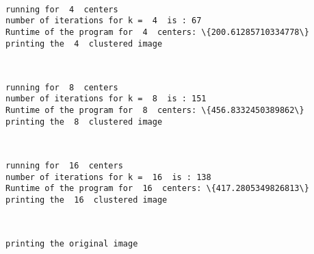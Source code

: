 \documentclass[11pt]{article}
\begin{document}
    \begin{center}
    \end{center}
    { \hspace*{\fill} \\}
    
    \begin{Verbatim}[commandchars=\\\{\}]
running for  4  centers
number of iterations for k =  4  is : 67
Runtime of the program for  4  centers: \{200.61285710334778\}
printing the  4  clustered image
    \end{Verbatim}

    \begin{center}
    \end{center}
    { \hspace*{\fill} \\}
    
    \begin{Verbatim}[commandchars=\\\{\}]
running for  8  centers
number of iterations for k =  8  is : 151
Runtime of the program for  8  centers: \{456.8332450389862\}
printing the  8  clustered image
    \end{Verbatim}

    \begin{center}
    \end{center}
    { \hspace*{\fill} \\}
    
    \begin{Verbatim}[commandchars=\\\{\}]
running for  16  centers
number of iterations for k =  16  is : 138
Runtime of the program for  16  centers: \{417.2805349826813\}
printing the  16  clustered image
    \end{Verbatim}

    \begin{center}
    \end{center}
    { \hspace*{\fill} \\}
    
    \begin{Verbatim}[commandchars=\\\{\}]
printing the original image
    \end{Verbatim}
\end{document}
